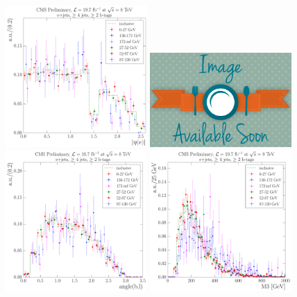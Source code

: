 \begin{figure}[hbtp]
    \centering
     \includegraphics[width=0.48\textwidth]{Chapters/04_Analysis/04b_XSections/images/8TeV/fit_variables/MET/electron_absolute_eta/vjets/MET_electron_absolute_eta_2orMoreBtags_VJets_template_comparison.pdf}\hfill
     \includegraphics[width=0.48\textwidth]{Chapters/04_Analysis/04b_XSections/images/placeholder.png}\\
     \includegraphics[width=0.48\textwidth]{Chapters/04_Analysis/04b_XSections/images/8TeV/fit_variables/MET/angle_bl/vjets/MET_angle_bl_2orMoreBtags_VJets_template_comparison.pdf}\hfill
     \includegraphics[width=0.48\textwidth]{Chapters/04_Analysis/04b_XSections/images/8TeV/fit_variables/MET/M3/vjets/MET_M3_2orMoreBtags_VJets_template_comparison.pdf}\\

\end{figure}
